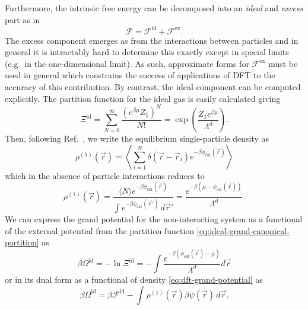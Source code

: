 Furthermore, the intrinsic free energy can be decomposed into an \emph{ideal} and \emph{excess} part as in
\begin{equation}\label{eq:F-decomposition}
  \mathcal{F}
  =
  \mathcal{F}^\mathrm{id} +
  \mathcal{F}^\mathrm{ex}.
\end{equation}
The excess component emerges as from the interactions between particles and in general it is intractably hard to determine this exactly except in special limits (e.g.\ in the one-dimensional limit).
As such, approximate forms for $\mathcal{F}^\mathrm{ex}$ must be used in general which constrains the success of applications of DFT to the accuracy of this contribution.
By contrast, the ideal component can be computed explicitly.
The partition function for the ideal gas is easily calculated giving
\begin{equation}\label{eq:ideal-grand-canonical-partition}
  \Xi^\mathrm{id}
  =
  \sum_{N=0}^\infty
  \frac{(e^{\beta\mu} Z_1)^N}{N!}
  =
  \exp{\left( \frac{Z_1 e^{\beta \mu}}{\Lambda^d} \right)}.
\end{equation}
Then, following Ref.\ \cite{AshcroftAJP1996}, we write the equilibrium single-particle density as
\begin{equation*}
  \rho^{(1)}(\vec{r})
  =
  \left\langle
  \sum_{i=1}^N \delta(\vec{r} - \vec{r}_i)
  e^{-\beta \phi_\mathrm{ext}(\vec{r})}
  \right\rangle
\end{equation*}
which in the absence of particle interactions reduces to
\begin{equation}\label{eq:ideal-density}
  \rho^{(1)}(\vec{r})
  =
  \frac{
    \langle N \rangle e^{-\beta \phi_\mathrm{ext}(\vec{r})}
  }{
    \int e^{-\beta \phi_\mathrm{ext}(\vec{r}')} \, d\vec{r}'
  }
  =
  \frac{e^{-\beta (\mu - \phi_\mathrm{ext}(\vec{r}))}}{\Lambda^d}.
\end{equation}
We can express the grand potential for the non-interacting system as a functional of the external potential from the partition function \eqref{eq:ideal-grand-canonical-partition} as
\begin{equation*}
  \beta\Omega^\mathrm{id}
  =
  - \ln{\Xi^\mathrm{id}}
  =
  - \int \frac{e^{-\beta (\phi_\mathrm{ext}(\vec{r}) - \mu)}}{\Lambda^d} d\vec{r}
\end{equation*}
or in its dual form as a functional of density \eqref{eq:dft-grand-potential} as
\begin{equation*}
  \beta\Omega^\mathrm{id}
  =
  \beta \mathcal{F}^\mathrm{id}
  - \int \rho^{(1)}(\vec{r}) \beta \psi(\vec{r}) \, d\vec{r}.
\end{equation*}

